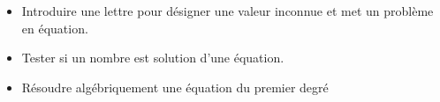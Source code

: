 \begin{prerequis}[Prérequis]    
    \begin{itemize}
    \item Introduire une lettre pour désigner une valeur inconnue et met
    un problème en équation.
    \item Tester si un nombre est solution d’une équation.
    \item Résoudre algébriquement une équation du premier degré
    \end{itemize}
\end{prerequis}
